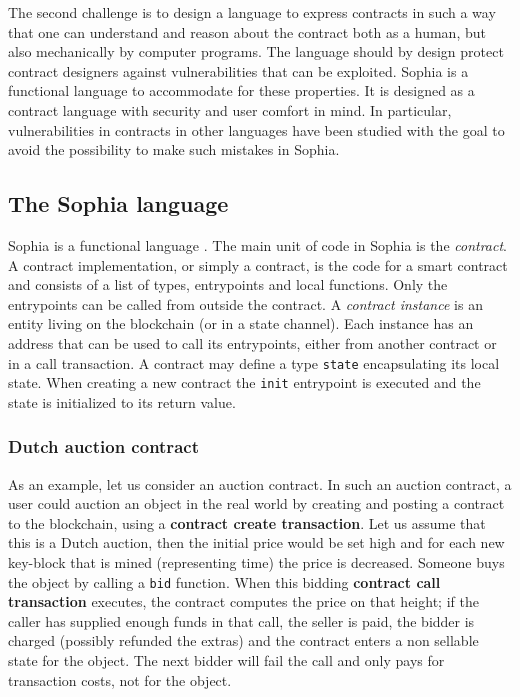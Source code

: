 The second challenge is to design a language to express contracts in
such a way that one can understand and reason about the contract
both as a human, but also mechanically by computer programs. The
language should by design protect contract designers against
vulnerabilities that can be exploited. Sophia is a functional language
to accommodate for these properties. It is designed as a contract
language with security and user comfort in mind. In particular,
vulnerabilities in contracts in other languages
\cite{atzei2017survey,mehar2019understanding,delmolino2016step} have been studied with the goal to
avoid the possibility to make such mistakes in Sophia.

\subsection{The Sophia language}


Sophia is a functional language \cite{hughes1989functional}.
The main unit of code in Sophia is the \textit{contract}.
A contract implementation, or simply a contract, is the code for a
smart contract and consists of a list of types, entrypoints and local
functions. Only the entrypoints can be called from outside the
contract.   A \textit{contract instance} is an entity living on the
blockchain (or in a state channel). Each instance has an address that
can be used to call its entrypoints, either from another contract or
in a call transaction.  A contract may define a type \texttt{state}
encapsulating its local state. When creating a new contract the
\texttt{init} entrypoint is executed and the state is initialized to its
return value.


\subsubsection{Dutch auction contract}

As an example, let us consider an auction contract.  In such an
auction contract, a user could auction an object in the real world by
creating and posting a contract to the blockchain, using a \textbf{contract
create transaction}. Let us assume that
this is a Dutch auction, then the initial price
would be set high and for each new key-block that is mined (representing
time) the price is decreased. Someone buys the object by calling a
\texttt{bid} function. When this bidding \textbf{contract call transaction} executes,
the contract computes the price on that height; if the caller has
supplied enough funds in that call, the seller is paid, the
bidder is charged (possibly refunded the extras) and the contract
enters a non sellable state for the object. The next bidder will fail
the call and only pays for transaction costs, not for the object.

